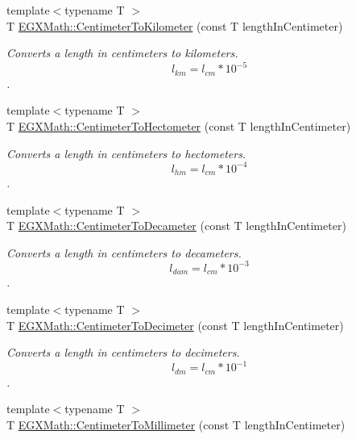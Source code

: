 \begin{DoxyCompactItemize}
{\footnotesize template$<$typename T $>$ }\\T \mbox{\hyperlink{group___e_g_x_math-_conversions-_length_conversions-_s_i-_centimeter-_s_i_ga3735c75e13286501568075ee1dfb97b7}{E\+G\+X\+Math\+::\+Centimeter\+To\+Kilometer}} (const T length\+In\+Centimeter)
\begin{DoxyCompactList}\small\item\em Converts a length in centimeters to kilometers. \[ l_{km}=l_{cm} * 10^{-5} \]. \end{DoxyCompactList}\item 
{\footnotesize template$<$typename T $>$ }\\T \mbox{\hyperlink{group___e_g_x_math-_conversions-_length_conversions-_s_i-_centimeter-_s_i_ga311c96c2d32cb295453bff9cbdfd8cdc}{E\+G\+X\+Math\+::\+Centimeter\+To\+Hectometer}} (const T length\+In\+Centimeter)
\begin{DoxyCompactList}\small\item\em Converts a length in centimeters to hectometers. \[ l_{hm}=l_{cm} * 10^{-4} \]. \end{DoxyCompactList}\item 
{\footnotesize template$<$typename T $>$ }\\T \mbox{\hyperlink{group___e_g_x_math-_conversions-_length_conversions-_s_i-_centimeter-_s_i_ga5f40a749a8759a89e5c618df3c3b7945}{E\+G\+X\+Math\+::\+Centimeter\+To\+Decameter}} (const T length\+In\+Centimeter)
\begin{DoxyCompactList}\small\item\em Converts a length in centimeters to decameters. \[ l_{dam}=l_{cm} * 10^{-3} \]. \end{DoxyCompactList}\item 
{\footnotesize template$<$typename T $>$ }\\T \mbox{\hyperlink{group___e_g_x_math-_conversions-_length_conversions-_s_i-_centimeter-_s_i_gae1263088b67f23124cc7770d66fbb38b}{E\+G\+X\+Math\+::\+Centimeter\+To\+Decimeter}} (const T length\+In\+Centimeter)
\begin{DoxyCompactList}\small\item\em Converts a length in centimeters to decimeters. \[ l_{dm}=l_{cm} * 10^{-1} \]. \end{DoxyCompactList}\item 
{\footnotesize template$<$typename T $>$ }\\T \mbox{\hyperlink{group___e_g_x_math-_conversions-_length_conversions-_s_i-_centimeter-_s_i_ga3adaa50da05ec6ead83e93dbd9406ae0}{E\+G\+X\+Math\+::\+Centimeter\+To\+Millimeter}} (const T length\+In\+Centimeter)

\end{DoxyCompactItemize}
